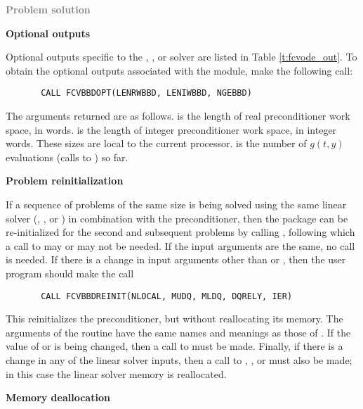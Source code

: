 \begin{Steps}
\item \textcolor{gray}{\bf Problem solution}
  
\item {\bf {\cvbbdpre} Optional outputs}
  
  Optional outputs specific to the {\spgmr}, {\spbcg}, or {\sptfqmr} solver are 
  listed in Table \ref{t:fcvode_out}.
  To obtain the optional outputs associated with the {\cvbbdpre} module, make
  the following call:
\begin{verbatim}
       CALL FCVBBDOPT(LENRWBBD, LENIWBBD, NGEBBD)
\end{verbatim}
  The arguments returned are as follows.
   is the length of real preconditioner work space, in 
  words.  is the length of integer preconditioner work space, in
  integer words.  These sizes are local to the current processor.
   is the number of $g(t,y)$ evaluations (calls to ) so far.
  
\item {\bf Problem reinitialization}
  
  If a sequence of problems of the same size is being solved using the same
  linear solver ({\spgmr}, {\spbcg}, or {\sptfqmr})  in combination with the
  {\cvbbdpre} preconditioner, then the {\cvode} package can be re-initialized
  for the second and subsequent problems by calling ,
  following which a call to  may or may not be needed.
  If the input arguments are the same, no  call is needed.
  If there is a change in input arguments other than  or ,
  then the user program should make the call 
\begin{verbatim}
       CALL FCVBBDREINIT(NLOCAL, MUDQ, MLDQ, DQRELY, IER)
\end{verbatim}
  This reinitializes the {\cvbbdpre} preconditioner, but without
  reallocating its memory.  The arguments of the 
  routine have the same names and meanings as those of .
  If the value of  or  is being changed, then a call to
   must be made.  Finally, if there is a change in any of the
  linear solver inputs, then a call to , , or
   must also be made; in this case the linear solver memory is
  reallocated.
  
\item {\bf Memory deallocation}


\end{Steps}

